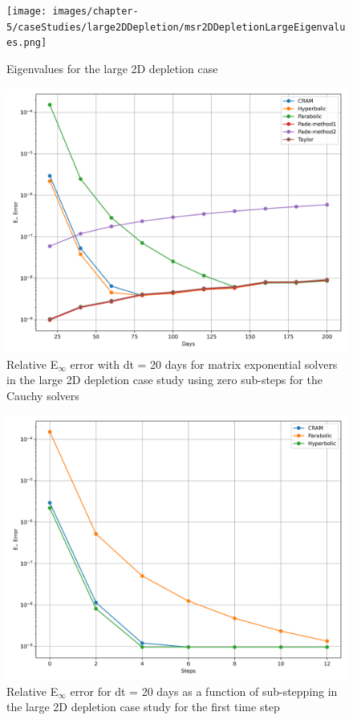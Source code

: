 \clearpage

\begin{figure}[p]
    \centering
    \texttt{[image: images/chapter-5/caseStudies/large2DDepletion/msr2DDepletionLargeEigenvalues.png]}
    \caption{Eigenvalues for the large 2D depletion case}
    \label{fig:large_2D_depletion_eigenvalues}
\end{figure}

\clearpage

\begin{figure}[p]
    \centering
    \includegraphics[width=5in]{images/chapter-5/caseStudies/large2DDepletion/msrLarge2DDepletionEinfErrorerrorSteps0.png}
    \caption{Relative E$_{\infty}$ error with dt = 20 days for matrix exponential solvers in the large 2D depletion case study using zero sub-steps for the Cauchy solvers}
    \label{fig:large_2D_depletion_Einf_steps0}
\end{figure}

\clearpage

\begin{figure}[p]
    \centering
    \includegraphics[width=5in]{images/chapter-5/caseStudies/large2DDepletion/msrLarge2DDepletionEinfErrorerrorWithSteps.png}
    \caption{Relative E$_{\infty}$ error for dt = 20 days as a function of sub-stepping in the large 2D depletion case study for the first time step}
    \label{fig:large_2D_depletion_Einf_with_substeps}
\end{figure}

